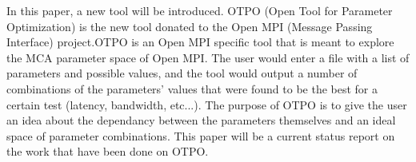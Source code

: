 In this paper, a new tool will be introduced. OTPO (Open Tool for Parameter
Optimization) is the new tool donated to the Open MPI (Message Passing
Interface) project.OTPO is an Open MPI specific tool that is meant to explore
the MCA parameter space of Open MPI. The user would enter a file with a list
of parameters and possible values, and the tool would output a number of
combinations of the parameters' values that were found to be the best for a
certain test (latency, bandwidth, etc...). The purpose of OTPO is to give the
user an idea about the dependancy between the parameters themselves and an
ideal space of parameter combinations. This paper will be a current status
report on the work that have been done on OTPO.